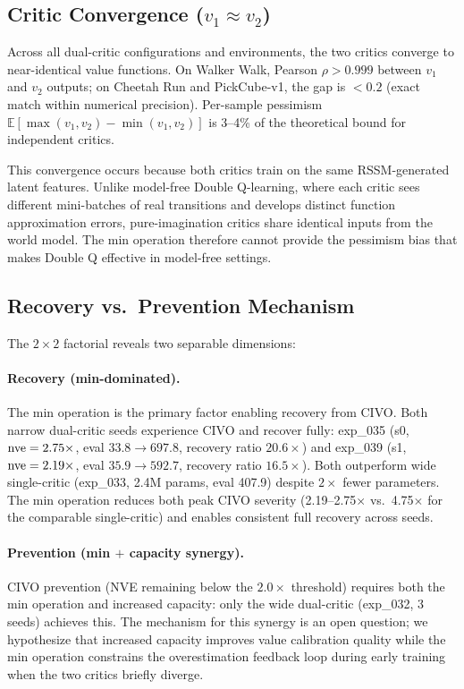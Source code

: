 \subsection{Critic Convergence (\texorpdfstring{$v_1 \approx v_2$}{v1 ≈ v2})}

Across all dual-critic configurations and environments, the two critics converge to near-identical value functions. On Walker Walk, Pearson $\rho > 0.999$ between $v_1$ and $v_2$ outputs; on Cheetah Run and PickCube-v1, the gap is $< 0.2$ (exact match within numerical precision). Per-sample pessimism $\mathbb{E}[\max(v_1, v_2) - \min(v_1, v_2)]$ is 3--4\% of the theoretical bound for independent critics.

This convergence occurs because both critics train on the same RSSM-generated latent features. Unlike model-free Double Q-learning, where each critic sees different mini-batches of real transitions and develops distinct function approximation errors, pure-imagination critics share identical inputs from the world model. The min operation therefore cannot provide the pessimism bias that makes Double Q effective in model-free settings.

\subsection{Recovery vs.\ Prevention Mechanism}

The $2{\times}2$ factorial reveals two separable dimensions:

\paragraph{Recovery (min-dominated).} The min operation is the primary factor enabling recovery from CIVO. Both narrow dual-critic seeds experience CIVO and recover fully: exp\_035 (s0, $\mathrm{nve} = 2.75\times$, eval $33.8 \to 697.8$, recovery ratio $20.6\times$) and exp\_039 (s1, $\mathrm{nve} = 2.19\times$, eval $35.9 \to 592.7$, recovery ratio $16.5\times$). Both outperform wide single-critic (exp\_033, 2.4M params, eval 407.9) despite $2\times$ fewer parameters. The min operation reduces both peak CIVO severity (2.19--2.75$\times$ vs.\ 4.75$\times$ for the comparable single-critic) and enables consistent full recovery across seeds.

\paragraph{Prevention (min $+$ capacity synergy).} CIVO prevention (NVE remaining below the $2.0\times$ threshold) requires both the min operation and increased capacity: only the wide dual-critic (exp\_032, 3 seeds) achieves this. The mechanism for this synergy is an open question; we hypothesize that increased capacity improves value calibration quality while the min operation constrains the overestimation feedback loop during early training when the two critics briefly diverge.

